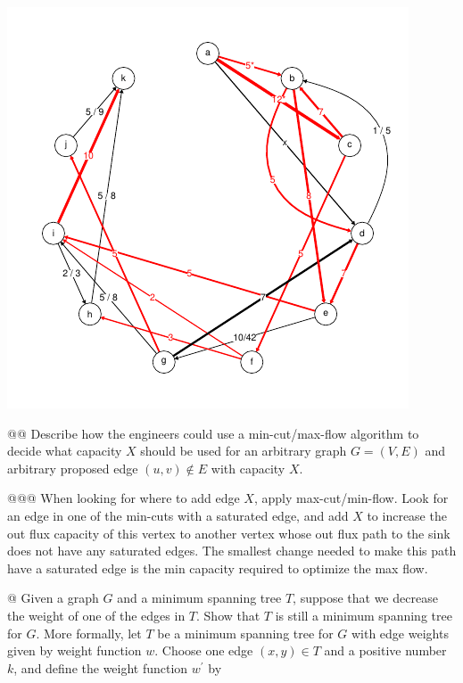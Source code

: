 \documentclass[10pt]{article}\usepackage[]{graphicx}\usepackage[]{xcolor}
\makeatletter
\def\maxwidth{ %
  \ifdim\Gin@nat@width>\linewidth
    \linewidth
  \else
    \Gin@nat@width
  \fi
}
\newenvironment{knitrout}{}{} %
\makeatother
\begin{document}
\begin{easylist}[enumerate]
\begin{knitrout}
\color{fgcolor}

{\centering \includegraphics[width=\maxwidth]{figure/unnamed-chunk-3} 

}



\end{knitrout}


    @@ Describe how the engineers could use a min-cut/max-flow algorithm to decide what capacity $X$ should be used for
    an arbitrary graph $G = (V, E)$ and arbitrary proposed edge $(u, v) \not\in E$ with capacity $X$.

    @@@ When looking for where to add edge $X$, apply max-cut/min-flow.  Look for an edge in one of the min-cuts with a
    saturated edge, and add $X$ to increase the out flux capacity of this vertex to another vertex whose out flux path
    to the sink does not have any saturated edges.  The smallest change needed to make this path have a saturated edge
    is the min capacity required to optimize the max flow.

    @ Given a graph $G$ and a minimum spanning tree $T$, suppose that we decrease the weight of one of the edges in $T$.
    Show that $T$ is still a minimum spanning tree for $G$. More formally, let $T$ be a minimum spanning tree for $G$
    with edge weights given by weight function $w$. Choose one edge $(x, y) \in T$ and a positive number $k$, and define
    the weight function $w^\prime$ by


\end{easylist}
\end{document}
